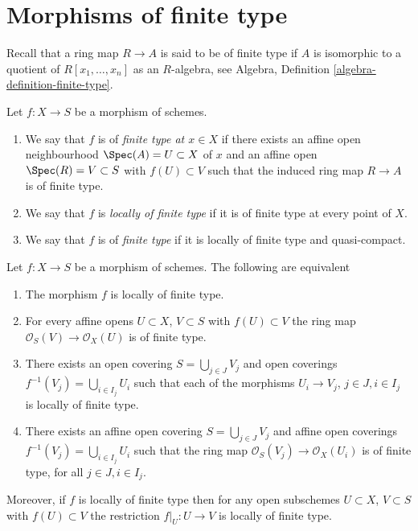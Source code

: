 \section{Morphisms of finite type}
\label{section-finite-type}

\noindent
Recall that a ring map $R \to A$ is said to be of finite type if
$A$ is isomorphic to a quotient of $R[x_1, \ldots, x_n]$ as an $R$-algebra, see
Algebra, Definition \ref{algebra-definition-finite-type}.

\begin{definition}
\label{definition-finite-type}
Let $f : X \to S$ be a morphism of schemes.
\begin{enumerate}
\item We say that $f$ is of {\it finite type at $x \in X$} if
there exists an affine open neighbourhood $\Spec(A) = U \subset X$
of $x$ and an affine open $\Spec(R) = V \subset S$
with $f(U) \subset V$ such that the induced ring map
$R \to A$ is of finite type.
\item We say that $f$ is {\it locally of finite type} if it is
of finite type at every point of $X$.
\item We say that $f$ is of {\it finite type} if it is locally of
finite type and quasi-compact.
\end{enumerate}
\end{definition}

\begin{lemma}
\label{lemma-locally-finite-type-characterize}
Let $f : X \to S$ be a morphism of schemes.
The following are equivalent
\begin{enumerate}
\item The morphism $f$ is locally of finite type.
\item For every affine opens $U \subset X$, $V \subset S$
with $f(U) \subset V$ the ring map
$\mathcal{O}_S(V) \to \mathcal{O}_X(U)$ is of finite type.
\item There exists an open covering $S = \bigcup_{j \in J} V_j$
and open coverings $f^{-1}(V_j) = \bigcup_{i \in I_j} U_i$ such
that each of the morphisms $U_i \to V_j$, $j\in J, i\in I_j$
is locally of finite type.
\item There exists an affine open covering $S = \bigcup_{j \in J} V_j$
and affine open coverings $f^{-1}(V_j) = \bigcup_{i \in I_j} U_i$ such
that the ring map $\mathcal{O}_S(V_j) \to \mathcal{O}_X(U_i)$ is
of finite type, for all $j\in J, i\in I_j$.
\end{enumerate}
Moreover, if $f$ is locally of finite type then for
any open subschemes $U \subset X$, $V \subset S$ with $f(U) \subset V$
the restriction $f|_U : U \to V$ is locally of finite type.
\end{lemma}

